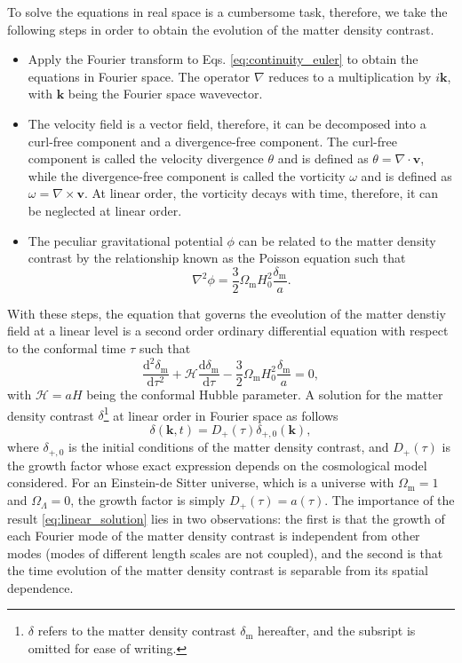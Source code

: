 To solve the equations in real space is a cumbersome task, therefore, we take the following steps in order to obtain the evolution of the matter density contrast.
\begin{itemize}
    \item Apply the Fourier transform to Eqs. \ref{eq:continuity_euler} to obtain the equations in Fourier space. The operator $\nabla$ reduces to a multiplication by $i\mathbf{k}$, with $\mathbf{k}$ being the Fourier space wavevector.
    \item The velocity field is a vector field, therefore, it can be decomposed into a curl-free component and a divergence-free component. The curl-free component is called the velocity divergence $\theta$ and is defined as $\theta = \nabla \cdot \mathbf{v}$, while the divergence-free component is called the vorticity $\omega$ and is defined as $\omega = \nabla \times \mathbf{v}$. At linear order, the vorticity decays with time, therefore, it can be neglected at linear order.
    \item The peculiar gravitational potential $\phi$ can be related to the matter density contrast by the relationship known as the Poisson equation such that
    \begin{equation}
    \nabla^2 \phi = \frac{3}{2}\Omega_{\mathrm{m}}H_0^2\frac{\delta_{\mathrm{m}}}{a}.
    \end{equation}
\end{itemize}
With these steps, the equation that governs the eveolution of the matter denstiy field at a linear level is a second order ordinary differential equation with respect to the conformal time $\tau$ such that
\begin{equation}\label{eq:}
    \frac{\mathrm{d}^2 \delta_{\mathrm{m}}}{\mathrm{d}\tau^2} + \mathcal{H} \frac{\mathrm{d} \delta_{\mathrm{m}}}{\mathrm{d}\tau} - \frac{3}{2}\Omega_{\mathrm{m}}H_0^2\frac{\delta_{\mathrm{m}}}{a} = 0,
\end{equation}with $\mathcal{H} = aH$ being the conformal Hubble parameter. A solution for the matter density contrast $\delta$\footnote{$\delta$ refers to the matter density contrast $\delta_{\mathrm{m}}$ hereafter, and the subsript is omitted for ease of writing.} at linear order in Fourier space as follows
\begin{equation}\label{eq:linear_solution}
    \delta(\mathbf{k}, t) = D_+(\tau)\delta_{+,0}(\mathbf{k}),
\end{equation}
where $\delta_{+,0}$ is the initial conditions of the matter density contrast, and $D_+(\tau)$ is the growth factor whose exact expression depends on the cosmological model considered. For an Einstein-de Sitter universe, which is a universe with $\Omega_{\mathrm{m}} = 1$ and $\Omega_\Lambda = 0$, the growth factor is simply $D_+(\tau) = a(\tau)$. The importance of the result \ref{eq:linear_solution} lies in two observations: the first is that the growth of each Fourier mode of the matter density contrast is independent from other modes (modes of different length scales are not coupled), and the second is that the time evolution of the matter density contrast is separable from its spatial dependence. 

